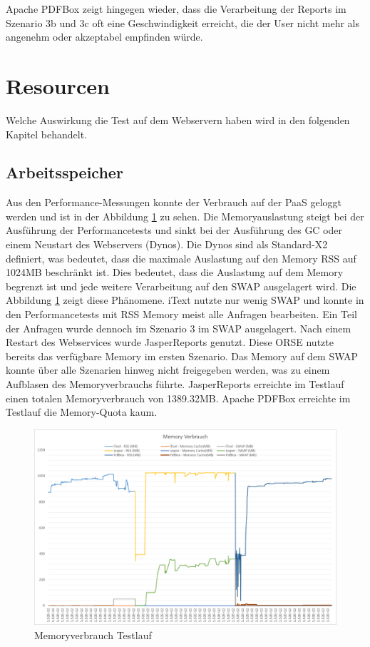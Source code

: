 \documentclass[main.tex]{subfiles}
\begin{document}
Apache PDFBox zeigt hingegen wieder, dass die Verarbeitung der Reports im Szenario 3b und 3c oft eine Geschwindigkeit erreicht, die der User nicht mehr als angenehm oder akzeptabel empfinden würde.








\section{Resourcen}

Welche Auswirkung die Test auf dem Webservern haben wird in den folgenden Kapitel behandelt. 

\subsection{Arbeitsspeicher}

Aus den Performance-Messungen konnte der Verbrauch auf der PaaS geloggt werden und ist in der Abbildung \ref{figure:memorytestlauf} zu sehen. Die Memoryauslastung steigt bei der Ausführung der Performancetests und sinkt bei der Ausführung des GC oder einem Neustart des Webservers (Dynos). Die Dynos sind als Standard-X2 definiert, was bedeutet, dass die maximale Auslastung auf den Memory RSS auf 1024MB beschränkt ist. Dies bedeutet, dass die Auslastung auf dem Memory begrenzt ist und jede weitere Verarbeitung auf den SWAP ausgelagert wird. Die Abbildung \ref{figure:memorytestlauf} zeigt diese Phänomene. iText nutzte nur wenig SWAP und konnte in den Performancetests mit RSS Memory meist alle Anfragen bearbeiten. Ein Teil der Anfragen wurde dennoch im Szenario 3 im SWAP ausgelagert. Nach einem Restart des Webservices wurde JasperReports genutzt. Diese ORSE nutzte bereits das verfügbare Memory im ersten Szenario. Das Memory auf dem SWAP konnte über alle Szenarien hinweg nicht freigegeben werden, was zu einem Aufblasen des Memoryverbrauchs führte. JasperReports erreichte im Testlauf einen totalen Memoryverbrauch von 1389.32MB. Apache PDFBox erreichte im Testlauf die Memory-Quota kaum.




\begin{figure}[!ht]
\includegraphics[width=\textwidth]{mainpart/4_analyse_img/MemoryVerbrauch.png}
 \caption{Memoryverbrauch Testlauf}
 \label{figure:memorytestlauf}
\end{figure}
\end{document}
